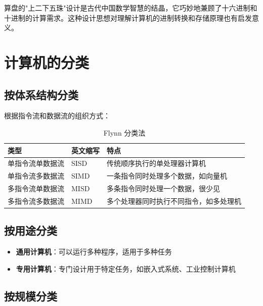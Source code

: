 \documentclass[12pt,UTF8]{ctexbook}
\begin{document}
算盘的"上二下五珠"设计是古代中国数学智慧的结晶，它巧妙地兼顾了十六进制和十进制的计算需求。这种设计思想对理解计算机的进制转换和存储原理也有启发意义。

\chapter{计算机的分类}
\label{chap:classification}

\section{按体系结构分类}

根据指令流和数据流的组织方式：

\begin{table}[htbp]
    \centering
    \caption{Flynn 分类法}
    \begin{tabular}{|p{3cm}|p{3cm}|p{4cm}|}
        \hline
        \textbf{类型} & \textbf{英文缩写} & \textbf{特点} \\
        \hline
        单指令流单数据流 & SISD & 传统顺序执行的单处理器计算机 \\
        \hline
        单指令流多数据流 & SIMD & 一条指令同时处理多个数据，如向量机 \\
        \hline
        多指令流单数据流 & MISD & 多条指令同时处理一个数据，很少见 \\
        \hline
        多指令流多数据流 & MIMD & 多个处理器同时执行不同指令，如多处理机 \\
        \hline
    \end{tabular}
\end{table}

\section{按用途分类}

\begin{itemize}[leftmargin=2cm]
    \item \textbf{通用计算机}：可以运行多种程序，适用于多种任务
    \item \textbf{专用计算机}：专门设计用于特定任务，如嵌入式系统、工业控制计算机
\end{itemize}

\section{按规模分类}
\end{document}
